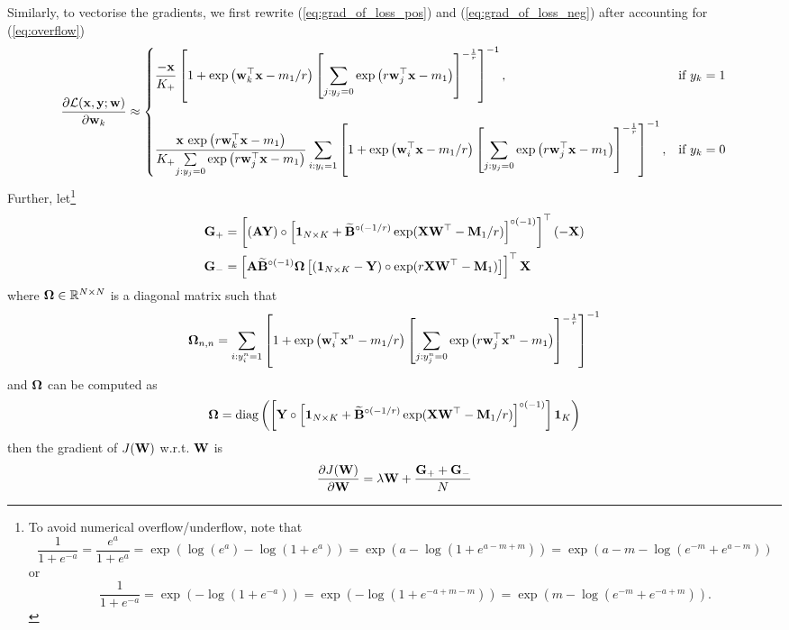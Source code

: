 Similarly, to vectorise the gradients, we first rewrite (\ref{eq:grad_of_loss_pos}) and (\ref{eq:grad_of_loss_neg}) 
after accounting for (\ref{eq:overflow})
$$
\frac{\partial \LCal(\x, \y; \w)} {\partial \w_k} \approx
\begin{cases}
\displaystyle\frac{-\x}{K_+}
\left[ 1 + \exp \left( \w_k^\top \x - m_1 / r \right) 
\left[ \underset{j:y_j=0}{\sum} \exp \left(r \w_j^\top \x - m_1 \right) \right]^{-\frac{1}{r}} \right]^{-1}, 
& \text{if} \ y_k = 1 \\ \\
%
\displaystyle \frac{\x \, \exp \left( r \w_k^\top \x - m_1 \right)} {K_+ \underset{j:y_j=0}{\sum} \exp \left(r \w_j^\top \x - m_1 \right) } 
\sum_{i:y_i=1}
\left[ 1 + \exp \left( \w_i^\top \x - m_1 /r \right) 
\left[ \underset{j:y_j=0}{\sum} \exp \left(r \w_j^\top \x - m_1 \right) \right]^{-\frac{1}{r}} \right]^{-1}, 
& \text{if} \ y_k = 0
\end{cases}
$$
Further, let\footnote{To avoid numerical overflow/underflow, note that 
$$
\frac{1}{1 + e^{-a}} = \frac{e^a}{1 + e^a} = \exp(\log(e^a) - \log(1 + e^a)) = \exp(a - \log(1 + e^{a-m+m})) = \exp(a - m - \log(e^{-m} + e^{a-m}))
$$
\hspace{2em}or
$$
\frac{1}{1 + e^{-a}} = \exp(-\log(1 + e^{-a})) = \exp(-\log(1 + e^{-a+m-m})) = \exp(m - \log(e^{-m} + e^{-a+m})).
$$
}
\begin{align*}
\mathbf{G}_+ 
&= \left[ (\mathbf{A} \mathbf{Y}) \circ \left[ \mathbf{1}_{N \times K} + \widetilde{\mathbf{B}}^{\circ (-1/r)} \exp(\mathbf{X} \mathbf{W}^\top - \mathbf{M}_1 / r) \right]^{\circ (-1)} \right]^\top (-\mathbf{X}) \\
\mathbf{G}_- 
&= \left[ \mathbf{A} \widetilde{\mathbf{B}}^{\circ (-1)} \bm{\Omega} \left[ (\mathbf{1}_{N \times K} - \mathbf{Y}) \circ \exp(r \mathbf{X} \mathbf{W}^\top - \mathbf{M}_1) \right] \right]^\top \mathbf{X}
\end{align*}
where $\bm{\Omega} \in \mathbb{R}^{N \times N}$ is a diagonal matrix such that
$$
\bm{\Omega}_{n,n}
= \sum_{i:y_i^n=1} \left[ 1 + 
  \exp \left( \mathbf{w}_i^\top \mathbf{x}^n - m_1 / r \right) 
  \left[ \underset{j:y_j^n=0}{\sum} \exp \left(r \mathbf{w}_j^\top \mathbf{x}^n - m_1 \right) \right]^{-\frac{1}{r}} \right]^{-1}
$$
and $\bm{\Omega}$ can be computed as
$$
\bm{\Omega} = \text{diag} \left( 
           \left[ \mathbf{Y} \circ \left[ \mathbf{1}_{N \times K} + 
           \widetilde{\mathbf{B}}^{\circ (-1/r)} \exp(\mathbf{X} \mathbf{W}^\top - \mathbf{M}_1 / r) \right]^{\circ (-1)} \right] \mathbf{1}_{K} \right)
$$
then the gradient of $J(\mathbf{W})$ w.r.t. $\mathbf{W}$ is
$$
\frac{\partial J(\mathbf{W})} {\partial \mathbf{W}} = \lambda \mathbf{W} + \frac{\mathbf{G}_+ + \mathbf{G}_-}{N}
$$
